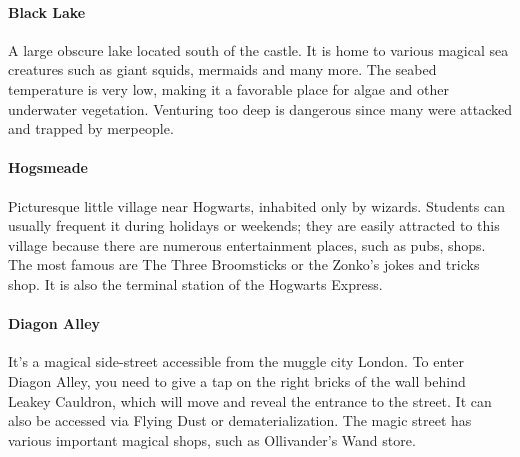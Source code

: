 \paragraph{Black Lake}
A large obscure lake located south of the castle. It is home to various magical sea creatures such as giant squids, mermaids and many more. The seabed temperature is very low, making it a favorable place for algae and other underwater vegetation. Venturing too deep is dangerous since many were attacked and trapped by merpeople.

\paragraph{Hogsmeade}
Picturesque little village near Hogwarts, inhabited only by wizards. Students can usually frequent it during holidays or weekends; they are easily attracted to this village because there are numerous entertainment places, such as pubs, shops. The most famous are The Three Broomsticks or the Zonko's jokes and tricks shop. It is also the terminal station of the Hogwarts Express. 

\paragraph{Diagon Alley}
It's a magical side-street accessible from the muggle city London. To enter Diagon Alley, you need to give a tap on the right bricks of the wall behind Leakey Cauldron, which will move and reveal the entrance to the street. It can also be accessed via Flying Dust or dematerialization. The magic street has various important magical shops, such as Ollivander's Wand store.

\pagebreak
